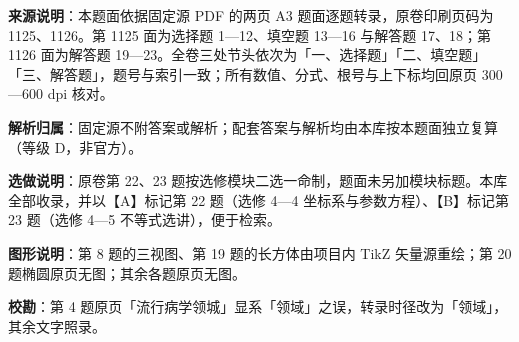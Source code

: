 

\begin{gknotice}
\textbf{来源说明}：本题面依据固定源 PDF 的两页 A3 题面逐题转录，原卷印刷页码为 1125、1126。第 1125 面为选择题 1—12、填空题 13—16 与解答题 17、18；第 1126 面为解答题 19—23。全卷三处节头依次为「一、选择题」「二、填空题」「三、解答题」，题号与索引一致；所有数值、分式、根号与上下标均回原页 300—600 dpi 核对。

\textbf{解析归属}：固定源不附答案或解析；配套答案与解析均由本库按本题面独立复算（等级 D，非官方）。

\textbf{选做说明}：原卷第 22、23 题按选修模块二选一命制，题面未另加模块标题。本库全部收录，并以【A】标记第 22 题（选修 4—4 坐标系与参数方程）、【B】标记第 23 题（选修 4—5 不等式选讲），便于检索。

\textbf{图形说明}：第 8 题的三视图、第 19 题的长方体由项目内 TikZ 矢量源重绘；第 20 题椭圆原页无图；其余各题原页无图。

\textbf{校勘}：第 4 题原页「流行病学领城」显系「领域」之误，转录时径改为「领域」，其余文字照录。
\end{gknotice}



